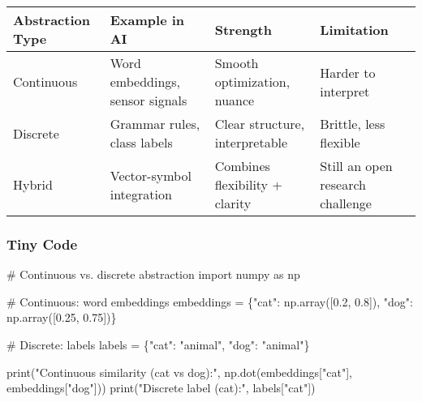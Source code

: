 \documentclass[
  letterpaper,
  DIV=11,
  numbers=noendperiod]{scrreprt}
\newenvironment{Shaded}{\begin{snugshade}}{\end{snugshade}}
\newcommand{\BuiltInTok}[1]{\textcolor[rgb]{0.00,0.23,0.31}{#1}}
\newcommand{\CommentTok}[1]{\textcolor[rgb]{0.37,0.37,0.37}{#1}}
\newcommand{\FloatTok}[1]{\textcolor[rgb]{0.68,0.00,0.00}{#1}}
\newcommand{\ImportTok}[1]{\textcolor[rgb]{0.00,0.46,0.62}{#1}}
\newcommand{\NormalTok}[1]{\textcolor[rgb]{0.00,0.23,0.31}{#1}}
\newcommand{\OperatorTok}[1]{\textcolor[rgb]{0.37,0.37,0.37}{#1}}
\newcommand{\StringTok}[1]{\textcolor[rgb]{0.13,0.47,0.30}{#1}}
\begin{document}
\begin{longtable}[]{@{}
  >{\raggedright\arraybackslash}p{}
  >{\raggedright\arraybackslash}p{}
  >{\raggedright\arraybackslash}p{}
  >{\raggedright\arraybackslash}p{}@{}}
\toprule\noalign{}
\begin{minipage}[b]{\linewidth}\raggedright
Abstraction Type
\end{minipage} & \begin{minipage}[b]{\linewidth}\raggedright
Example in AI
\end{minipage} & \begin{minipage}[b]{\linewidth}\raggedright
Strength
\end{minipage} & \begin{minipage}[b]{\linewidth}\raggedright
Limitation
\end{minipage} \\
\midrule\noalign{}
\endhead
\bottomrule\noalign{}
\endlastfoot
Continuous & Word embeddings, sensor signals & Smooth optimization,
nuance & Harder to interpret \\
Discrete & Grammar rules, class labels & Clear structure, interpretable
& Brittle, less flexible \\
Hybrid & Vector-symbol integration & Combines flexibility + clarity &
Still an open research challenge \\
\end{longtable}

\subsubsection{Tiny Code}\label{tiny-code-45}

\begin{Shaded}
\begin{Highlighting}[]
\CommentTok{\# Continuous vs. discrete abstraction}
\ImportTok{import}\NormalTok{ numpy }\ImportTok{as}\NormalTok{ np}

\CommentTok{\# Continuous: word embeddings}
\NormalTok{embeddings }\OperatorTok{=}\NormalTok{ \{}\StringTok{"cat"}\NormalTok{: np.array([}\FloatTok{0.2}\NormalTok{, }\FloatTok{0.8}\NormalTok{]),}
              \StringTok{"dog"}\NormalTok{: np.array([}\FloatTok{0.25}\NormalTok{, }\FloatTok{0.75}\NormalTok{])\}}

\CommentTok{\# Discrete: labels}
\NormalTok{labels }\OperatorTok{=}\NormalTok{ \{}\StringTok{"cat"}\NormalTok{: }\StringTok{"animal"}\NormalTok{, }\StringTok{"dog"}\NormalTok{: }\StringTok{"animal"}\NormalTok{\}}

\BuiltInTok{print}\NormalTok{(}\StringTok{"Continuous similarity (cat vs dog):"}\NormalTok{,}
\NormalTok{      np.dot(embeddings[}\StringTok{"cat"}\NormalTok{], embeddings[}\StringTok{"dog"}\NormalTok{]))}
\BuiltInTok{print}\NormalTok{(}\StringTok{"Discrete label (cat):"}\NormalTok{, labels[}\StringTok{"cat"}\NormalTok{])}
\end{Highlighting}
\end{Shaded}
\end{document}
